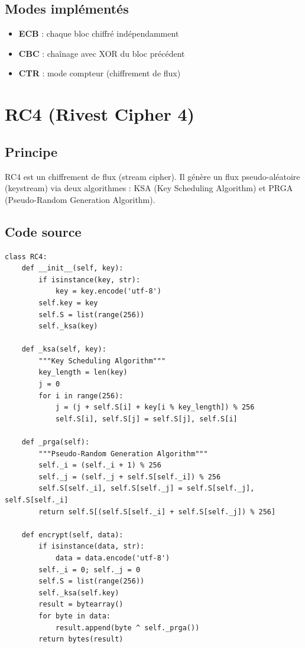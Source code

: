 \documentclass[12pt,a4paper]{report}
\begin{document}
\subsection{Modes implémentés}
\begin{itemize}
    \item \textbf{ECB} : chaque bloc chiffré indépendamment
    \item \textbf{CBC} : chaînage avec XOR du bloc précédent
    \item \textbf{CTR} : mode compteur (chiffrement de flux)
\end{itemize}

\section{RC4 (Rivest Cipher 4)}

\subsection{Principe}
RC4 est un chiffrement de flux (stream cipher). Il génère un flux pseudo-aléatoire (keystream) via deux algorithmes : KSA (Key Scheduling Algorithm) et PRGA (Pseudo-Random Generation Algorithm).

\subsection{Code source}
\begin{lstlisting}[style=python,caption=RC4.py - Algorithmes KSA et PRGA]
class RC4:
    def __init__(self, key):
        if isinstance(key, str):
            key = key.encode('utf-8')
        self.key = key
        self.S = list(range(256))
        self._ksa(key)

    def _ksa(self, key):
        """Key Scheduling Algorithm"""
        key_length = len(key)
        j = 0
        for i in range(256):
            j = (j + self.S[i] + key[i % key_length]) % 256
            self.S[i], self.S[j] = self.S[j], self.S[i]

    def _prga(self):
        """Pseudo-Random Generation Algorithm"""
        self._i = (self._i + 1) % 256
        self._j = (self._j + self.S[self._i]) % 256
        self.S[self._i], self.S[self._j] = self.S[self._j], self.S[self._i]
        return self.S[(self.S[self._i] + self.S[self._j]) % 256]

    def encrypt(self, data):
        if isinstance(data, str):
            data = data.encode('utf-8')
        self._i = 0; self._j = 0
        self.S = list(range(256))
        self._ksa(self.key)
        result = bytearray()
        for byte in data:
            result.append(byte ^ self._prga())
        return bytes(result)
\end{lstlisting}
\end{document}
